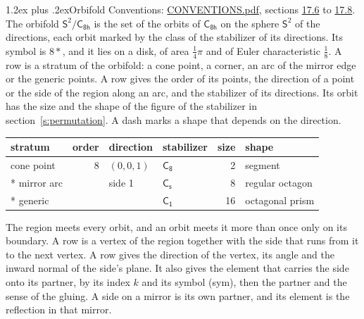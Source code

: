\documentclass[10pt,a4paper]{article}
\makeatletter
\renewcommand\section{\@startsection{section}{1}{\z@}{-3ex plus -1ex minus -.2ex}%
  {1.2ex plus .2ex}{\normalfont\large\sffamily\bfseries\color{parttitle}}}
\numberwithin{equation}{section}
\newcommand{\grp}[1]{\mathsf{#1}}
\newcommand{\orbname}[1]{#1}
\newcommand{\dirvec}[3]{(#1, #2, #3)}
\newcommand{\twosphere}{\mathsf{S}^{2}}
\makeatother
\begin{document}
\section{Orbifold}\label{s:orbifold}
Conventions: \href{../../CONVENTIONS.pdf}{CONVENTIONS.pdf}, sections \href{../../CONVENTIONS.pdf\#conv.17.6}{17.6} to \href{../../CONVENTIONS.pdf\#conv.17.8}{17.8}.
The orbifold $\twosphere/\grp{C_{8h}}$ is the set of the orbits of $\grp{C_{8h}}$ on the sphere $\twosphere$ of the directions, each orbit marked by the class of the stabilizer of its directions. Its symbol is $\orbname{8{\ast}}$, and it lies on a disk, of area $\tfrac{1}{4}\pi$ and of Euler characteristic $\tfrac{1}{8}$.
\leavevmode\label{n:head.stratum}\label{n:head.order.point}\label{n:head.direction}\label{n:head.stabilizer}\label{n:head.size.orbit}\label{n:head.shape}A row is a stratum of the orbifold: a cone point, a corner, an arc of the mirror edge or the generic points. A row gives the order of its points, the direction of a point or the side of the region along an arc, and the stabilizer of its directions. Its orbit has the size and the shape of the figure of the stabilizer in section~\ref{s:permutation}. A dash marks a shape that depends on the direction.
{\small\setlength{\tabcolsep}{4pt}\begin{longtable}{@{}lrllrl@{}}\toprule
stratum & order & direction & stabilizer & size & shape\\\midrule\endhead
\bottomrule\endfoot\endlastfoot
cone point & 8 & $\dirvec{0}{0}{1}$ & \href{C8.pdf}{$\grp{C_{8}}$} & 2 & segment\\*
mirror arc &  & side 1 & \href{C1v.pdf}{$\grp{C_{s}}$} & 8 & regular octagon\\*
generic &  &  & \href{C1.pdf}{$\grp{C_{1}}$} & 16 & octagonal prism\\
\bottomrule\end{longtable}}
\leavevmode\label{n:head.vertex.region}\label{n:head.angle}\label{n:head.normal.side}\label{n:head.partner}\label{n:head.sense}The region meets every orbit, and an orbit meets it more than once only on its boundary. A row is a vertex of the region together with the side that runs from it to the next vertex. A row gives the direction of the vertex, its angle and the inward normal of the side's plane. It also gives the element that carries the side onto its partner, by its index $k$ and its symbol (sym), then the partner and the sense of the gluing. A side on a mirror is its own partner, and its element is the reflection in that mirror.
\end{document}
